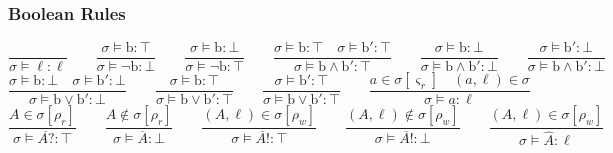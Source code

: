 \documentclass[times,10pt]{article}
\begin{document}
\subsubsection{Boolean Rules}
$$
    \frac{}{\sigma \models \ell : \ell} \qquad
    \frac{\sigma \models \mathrm{b} : \top}{\sigma \models \neg \mathrm{b} : \bot} \qquad
    \frac{\sigma \models \mathrm{b} : \bot}{\sigma \models \neg \mathrm{b} : \top} \qquad
    \frac{\sigma \models \mathrm{b} : \top \quad \sigma \models \mathrm{b}' : \top}{\sigma \models \mathrm{b} \wedge \mathrm{b}' : \top} \qquad
    \frac{\sigma \models \mathrm{b} : \bot}{\sigma \models \mathrm{b} \wedge \mathrm{b}' : \bot} \qquad
    \frac{\sigma \models \mathrm{b}' : \bot}{\sigma \models \mathrm{b} \wedge \mathrm{b}' : \bot} $$$$
    \frac{\sigma \models \mathrm{b} : \bot \quad \sigma \models \mathrm{b}' : \bot}{\sigma \models \mathrm{b} \vee \mathrm{b}' : \bot} \qquad
    \frac{\sigma \models \mathrm{b} : \top}{\sigma \models \mathrm{b} \vee \mathrm{b}' : \top} \qquad
    \frac{\sigma \models \mathrm{b}' : \top}{\sigma \models \mathrm{b} \vee \mathrm{b}' : \top} \qquad
    \frac{a \in \sigma[\varsigma_r] \quad (a, \ell) \in \sigma}{\sigma \models a : \ell} $$$$
    \frac{A \in \sigma[\rho_r]}{\sigma \models \overline{A?} : \top} \qquad
    \frac{A \notin \sigma[\rho_r]}{\sigma \models \overline{A} : \bot} \qquad
    \frac{(A, \ell) \in \sigma[\rho_w]}{\sigma \models \overline{A!} : \top} \qquad
    \frac{(A, \ell) \notin \sigma[\rho_w]}{\sigma \models \overline{A!} : \bot} \qquad
    \frac{(A, \ell) \in \sigma[\rho_w]}{\sigma \models \widehat{A} : \ell}
$$
\end{document}
